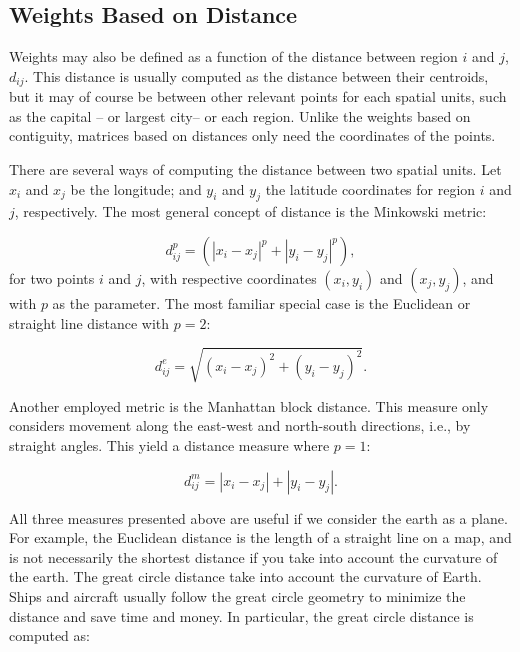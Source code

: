 \documentclass[english,12pt]{book}\usepackage[]{graphicx}\usepackage[]{xcolor}
\begin{document}
\subsection{Weights Based on Distance}

Weights may also be defined as a function of the distance between region $i$ and $j$, $d_{ij}$. This distance is usually computed as the distance between their centroids, but it may of course be between other relevant points for each spatial units, such as the capital -- or largest city-- or each region. Unlike the weights based on contiguity, matrices based on distances only need the coordinates of the points.

There are several ways of computing the distance between two spatial units. Let $x_i$ and $x_j$ be the longitude; and $y_i$ and $y_j$ the latitude coordinates for region $i$ and $j$, respectively. The most general concept of distance is the Minkowski metric:

\begin{equation*}
  d_{ij}^p = \left(\left|x_i - x_j\right|^p + \left|y_i - y_j\right|^p\right),
\end{equation*}
%
for two points $i$ and $j$, with respective coordinates $(x_i, y_i)$ and $(x_j, y_j)$, and with $p$ as the parameter. The most familiar special case is the Euclidean or straight line distance with $p = 2$:

\begin{equation*}
  d_{ij}^e = \sqrt{(x_i - x_j)^2 + (y_i - y_j)^2}.
\end{equation*}

Another employed metric is the Manhattan block distance. This measure only considers movement along the east-west and north-south directions, i.e., by straight angles. This yield a distance measure where $p = 1$:

\begin{equation*}
   d_{ij}^m = \left|x_i - x_j\right| + \left|y_i - y_j\right|.
\end{equation*}

All three measures presented above are useful if we consider the earth as a plane. For example, the Euclidean distance is the length of a straight line on a map, and is not necessarily the shortest distance if you take into account the curvature of the earth. The great circle distance take into account the curvature of Earth. Ships and aircraft usually follow the great circle geometry to minimize the distance and save time and money.  In particular, the great circle distance is computed as:
\end{document}
